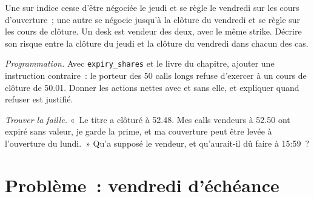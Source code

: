 \begin{exercise}[$\star\star$]\label{exo:m1:option-contracts-and-exchanges:6}
Une  sur indice cesse d'être négociée le jeudi et se règle le vendredi
sur les cours d'ouverture~; une autre se négocie jusqu'à la clôture du vendredi et se règle
sur les cours de clôture. Un desk est vendeur des deux, avec le même strike. Décrire
son risque entre la clôture du jeudi et la clôture du vendredi dans chacun des cas.
\end{exercise}

\begin{exercise}[$\star\star\star$]\label{exo:m1:option-contracts-and-exchanges:7}
\emph{Programmation.} Avec \texttt{expiry\_shares} et le livre du chapitre, ajouter une
instruction contraire~: le porteur des 50 calls longs refuse d'exercer à un cours de
clôture de 50.01. Donner les actions nettes avec et sans elle, et expliquer quand
refuser est justifié.
\end{exercise}

\begin{exercise}[$\star\star\star$]\label{exo:m1:option-contracts-and-exchanges:8}
\emph{Trouver la faille.} «~Le titre a clôturé à 52.48. Mes calls vendeurs à 52.50
ont expiré sans valeur, je garde la prime, et ma couverture peut être levée à l'ouverture du
lundi.~» Qu'a supposé le vendeur, et qu'aurait-il dû faire à
15:59~?
\end{exercise}

\section{Problème~: vendredi d'échéance}

